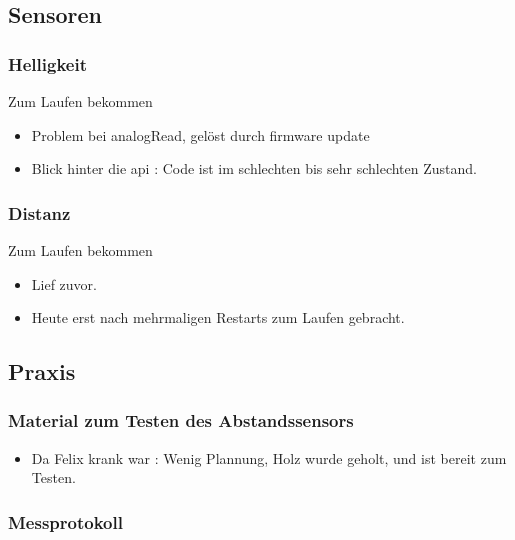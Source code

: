 \documentclass{article}
\begin{document}
\subsection{Sensoren}

\subsubsection{Helligkeit}

Zum Laufen bekommen

\begin{itemize}

\item Problem bei analogRead, gel\"{o}st durch firmware update

\item Blick hinter die api : Code ist im schlechten bis sehr schlechten Zustand.

\end{itemize}

\subsubsection{Distanz}

Zum Laufen bekommen

\begin{itemize}

\item Lief zuvor.

\item Heute erst nach mehrmaligen Restarts zum Laufen gebracht.

\end{itemize}

\subsection{Praxis}

\subsubsection{Material zum Testen des Abstandssensors}

\begin{itemize}

\item Da Felix krank war : Wenig Plannung, Holz wurde geholt, und ist bereit zum Testen.

\end{itemize}

\subsubsection{Messprotokoll}
\end{document}
